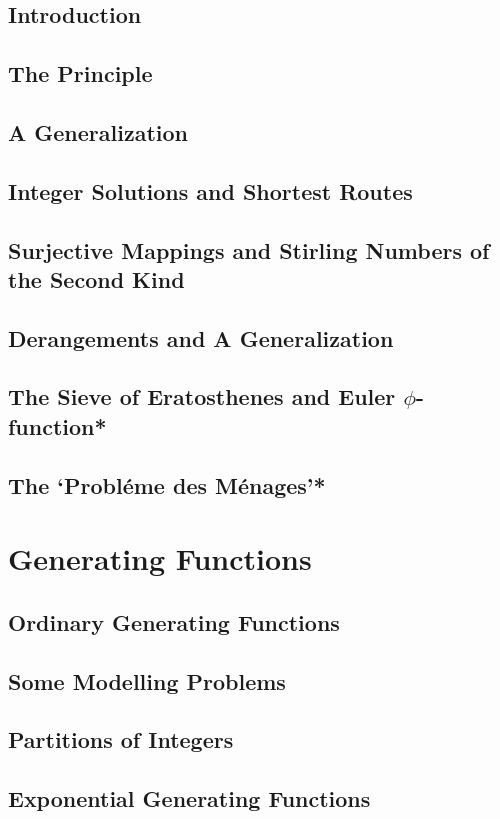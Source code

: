 \subsection{Introduction}
\subsection{The Principle}
\subsection{A Generalization}
\subsection{Integer Solutions and Shortest Routes}
\subsection{Surjective Mappings and Stirling Numbers of the Second Kind}
\subsection{Derangements and A Generalization}
\subsection{The Sieve of Eratosthenes and Euler $\phi$-function*}
\subsection{The `Probl\'eme des M\'enages'*}

\section{Generating Functions}
\subsection{Ordinary Generating Functions}
\subsection{Some Modelling Problems}
\subsection{Partitions of Integers}
\subsection{Exponential Generating Functions}

